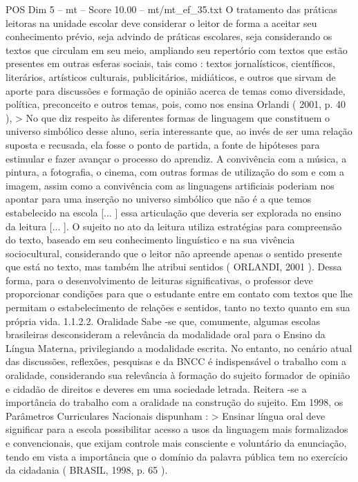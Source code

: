 \begin{textsample}{POS Dim 5 – mt – Score 10.00 – mt/mt\_ef\_35.txt}
O tratamento das práticas leitoras na unidade escolar deve considerar o leitor de forma a aceitar seu conhecimento prévio, seja advindo de práticas escolares, seja considerando os textos que circulam em seu meio, ampliando seu repertório com textos que estão presentes em outras esferas sociais, tais como : textos jornalísticos, científicos, literários, artísticos culturais, publicitários, midiáticos, e outros que sirvam de aporte para discussões e formação de opinião acerca de temas como diversidade, política, preconceito e outros temas, pois, como nos ensina Orlandi ( 2001, p. 40 ), > No que diz respeito às diferentes formas de linguagem que constituem o universo simbólico desse aluno, seria interessante que, ao invés de ser uma relação suposta e recusada, ela fosse o ponto de partida, a fonte de hipóteses para estimular e fazer avançar o processo do aprendiz.
A convivência com a música, a pintura, a fotografia, o cinema, com outras formas de utilização do som e com a imagem, assim como a convivência com as linguagens artificiais poderiam nos apontar para uma inserção no universo simbólico que não é a que temos estabelecido na escola [... ] essa articulação que deveria ser explorada no ensino da leitura [... ].
O sujeito no ato da leitura utiliza estratégias para compreensão do texto, baseado em seu conhecimento linguístico e na sua vivência sociocultural, considerando que o leitor não apreende apenas o sentido presente que está no texto, mas também lhe atribui sentidos ( ORLANDI, 2001 ).
Dessa forma, para o desenvolvimento de leituras significativas, o professor deve proporcionar condições para que o estudante entre em contato com textos que lhe permitam o estabelecimento de relações e sentidos, tanto no texto quanto em sua própria vida. 1.1.2.2.
Oralidade Sabe -se que, comumente, algumas escolas brasileiras desconsideram a relevância da modalidade oral para o Ensino da Língua Materna, privilegiando a modalidade escrita.
No entanto, no cenário atual das discussões, reflexões, pesquisas e da BNCC é indispensável o trabalho com a oralidade, considerando sua relevância à formação do sujeito formador de opinião e cidadão de direitos e deveres em uma sociedade letrada.
Reitera -se a importância do trabalho com a oralidade na construção do sujeito.
Em 1998, os Parâmetros Curriculares Nacionais dispunham : > Ensinar língua oral deve significar para a escola possibilitar acesso a usos da linguagem mais formalizados e convencionais, que exijam controle mais consciente e voluntário da enunciação, tendo em vista a importância que o domínio da palavra pública tem no exercício da cidadania ( BRASIL, 1998, p. 65 ).

\end{textsample}
